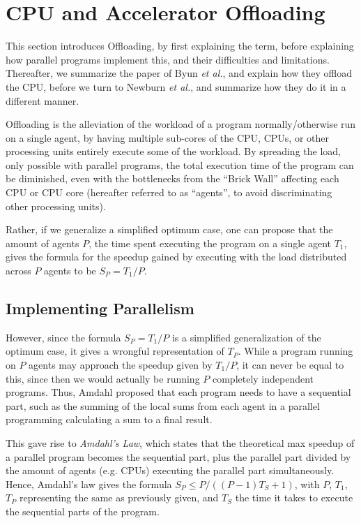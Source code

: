 
\section{CPU and Accelerator Offloading}
\label{sec:offloading}

This section introduces Offloading, by first explaining the term, before explaining how parallel programs implement this, and their difficulties and limitations.
Thereafter, we summarize the paper of Byun \textit{et al.}\cite{Byun:EECS-2012-215}, and explain how they offload the CPU, before we turn to Newburn \textit{et al.}\cite{Newburn:2013:OCR:2510648.2511038}, and summarize how they do it in a different manner.

Offloading is the alleviation of the workload of a program normally/otherwise run on a single agent, by having multiple sub-cores of the CPU, CPUs, or other processing units entirely execute some of the workload.
By spreading the load, only possible with parallel programs, the total execution time of the program can be diminished, even with the bottlenecks from the ``Brick Wall'' affecting each CPU or CPU core (hereafter referred to as ``agents'', to avoid discriminating other processing units).

Rather, if we generalize a simplified optimum case, one can propose that the amount of agents $P$, the time spent executing the program on a single agent $T_1$, gives the formula for the speedup gained by executing with the load distributed across $P$ agents to be $S_P = T_1/P$.

\subsection{Implementing Parallelism}

However, since the formula $S_P = T_1/P$ is a simplified generalization of the optimum case, it gives a wrongful representation of $T_P$.
While a program running on $P$ agents may approach the speedup given by $T_1/P$, it can never be equal to this, since then we would actually be running $P$ completely independent programs.
Thus, Amdahl\cite{Amdahl:1967:VSP:1465482.1465560} proposed that each program needs to have a sequential part, such as the summing of the local sums from each agent in a parallel programming calculating a sum to a final result.

This gave rise to \textit{Amdahl's Law}, which states that the theoretical max speedup of a parallel program becomes the sequential part, plus the parallel part divided by the amount of agents (e.g. CPUs) executing the parallel part simultaneously.
Hence, Amdahl's law gives the formula $S_P \leq P/((P-1)T_S + 1)$, with $P$, $T_1$, $T_P$ representing the same as previously given, and $T_S$ the time it takes to execute the sequential parts of the program.

